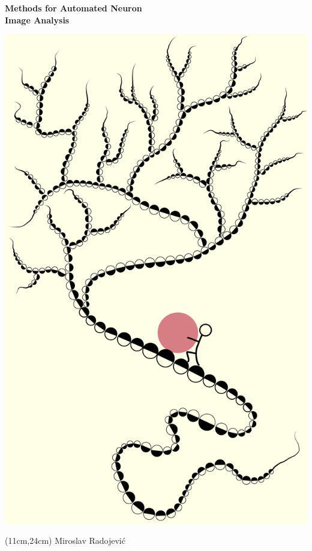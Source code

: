 \begin{changemargin}{-1cm}{-1cm}

\begin{center}
	{\Huge\bf Methods for Automated Neuron \\[1ex] Image Analysis \\[2.2ex]}
\end{center}


\begin{center}
	\includegraphics[height=1.23\linewidth]{./cover/syziphus}
\end{center}


\begin{textblock*}{\textwidth}(11cm,24cm)
	{\huge Miroslav Radojevi\'{c}}
\end{textblock*}

\end{changemargin}

